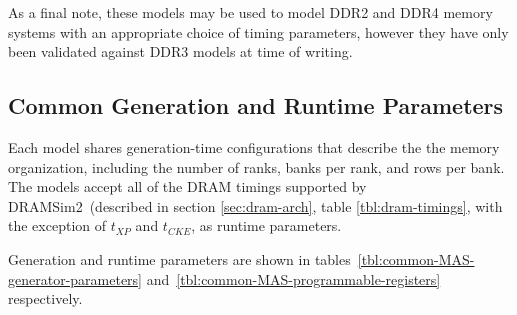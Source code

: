 As a final note, these models may be used to model DDR2 and DDR4 memory systems with an
appropriate choice of timing parameters, however they have only been validated
against DDR3 models at time of writing.

\subsection{Common Generation and Runtime Parameters}

Each model shares generation-time configurations that describe the
the memory organization, including the number of ranks,
banks per rank, and rows per bank. The models accept all of the DRAM timings supported by DRAMSim2~(described in
section \ref{sec:dram-arch}, table \ref{tbl:dram-timings}, with the exception
of $t_{XP}$ and $t_{CKE}$, as runtime parameters.

\noindent Generation and runtime parameters are shown in
tables~\ref{tbl:common-MAS-generator-parameters}
and~\ref{tbl:common-MAS-programmable-registers}
respectively.

\begin{table}[htb]
\begin{center}
\end{center}
\caption{Common generation parameters of the DDR3 MAS models.}
\label{tbl:common-MAS-generator-parameters}
\end{table}%

